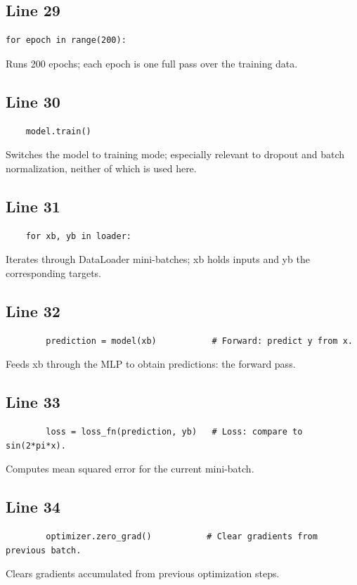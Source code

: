 \documentclass[11pt,a4paper]{article}
\begin{document}
\subsection*{Line 29}
\begin{lstlisting}
for epoch in range(200):
\end{lstlisting}
Runs 200 epochs; each epoch is one full pass over the training data.

\subsection*{Line 30}
\begin{lstlisting}
    model.train()
\end{lstlisting}
Switches the model to training mode; especially relevant to dropout and batch normalization, neither of which is used here.

\subsection*{Line 31}
\begin{lstlisting}
    for xb, yb in loader:
\end{lstlisting}
Iterates through DataLoader mini-batches; xb holds inputs and yb the corresponding targets.

\subsection*{Line 32}
\begin{lstlisting}
        prediction = model(xb)           # Forward: predict y from x.
\end{lstlisting}
Feeds xb through the MLP to obtain predictions: the forward pass.

\subsection*{Line 33}
\begin{lstlisting}
        loss = loss_fn(prediction, yb)   # Loss: compare to sin(2*pi*x).
\end{lstlisting}
Computes mean squared error for the current mini-batch.

\subsection*{Line 34}
\begin{lstlisting}
        optimizer.zero_grad()           # Clear gradients from previous batch.
\end{lstlisting}
Clears gradients accumulated from previous optimization steps.
\end{document}
